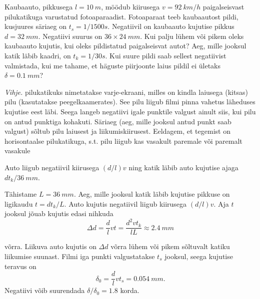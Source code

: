 
Kaubaauto, pikkusega $l = \SI{10}{m}$, möödub kiirusega $v = \SI{92}{km/h}$ paigalseisvast pilukatikuga varustatud fotoaparaadist. Fotoaparaat teeb kaubaautost pildi, kusjuures säriaeg on $t_s = 1/1500\si{s}$. Negatiivil on kaubaauto kujutise pikkus $d = \SI{32}{mm}$. Negatiivi suurus on $36\times\SI{24}{mm}$. Kui palju lühem või pikem oleks kaubaauto kujutis, kui oleks pildistatud paigalseisvat autot? Aeg, mille jooksul katik läbib kaadri, on $t_k = 1/30\si{s}$. Kui suure pildi saab sellest negatiivist valmistada, kui me tahame, et häguste piirjoonte laius pildil ei ületaks $\delta = \SI{0,1}{mm}$?

\emph{Vihje.} pilukatikuks nimetatakse varje-ekraani, milles on kindla laiusega (kitsas) pilu (kasutatakse peegelkaamerates). See pilu liigub filmi pinna vahetus läheduses kujutise eest läbi. Seega langeb negatiivi igale punktile valgust ainult siis, kui pilu on antud punktiga kohakuti. Säriaeg (aeg, mille jooksul antud punkt saab valgust) sõltub pilu laiusest ja liikumiskiirusest. Eeldagem, et tegemist on horisontaalse pilukatikuga, s.t. pilu liigub kas vasakult paremale või paremalt vasakule

\hint
Auto liigub negatiivil kiirusega $(d/l)v$ ning katik läbib auto kujutise ajaga $d t_k / \SI{36}{mm}$.

\solu
Tähistame $L=\SI{36}{mm}$. Aeg, mille jooksul katik läbib kujutise pikkuse on ligikaudu $t=d t_{k} / L$. Auto kujutis negatiivil liigub kiirusega $(d / l) v$. Aja $t$ jooksul jõuab kujutis edasi nihkuda
$$
\Delta d=\frac{d}{l} v t=\frac{d^{2} v t_{k}}{l L} \approx \SI{2,4}{mm}
$$

võrra. Liikuva auto kujutis on $\Delta d$ võrra lühem või pikem sõltuvalt katiku liikumise suunast.
Filmi iga punkti valgustatakse $t_{s}$ jooksul, seega kujutise teravus on
$$
\delta_{0}=\frac{d}{l} v t_{s}=\SI{0,054}{mm}.
$$
Negatiivi võib suurendada $\delta / \delta_{0}=\num{1,8}$ korda.
\probend